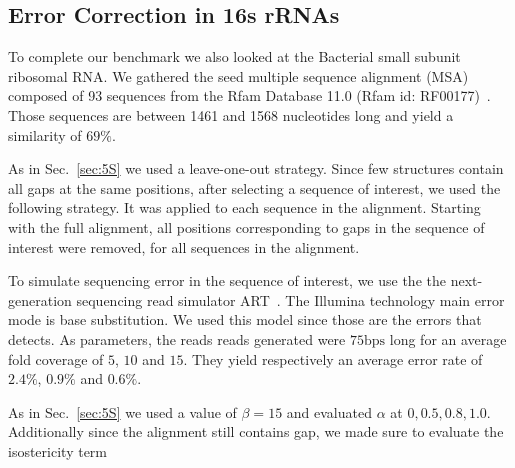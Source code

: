 \subsection{Error Correction in 16s rRNAs}
\label{sec:16S}

To complete our benchmark we also looked at the Bacterial small subunit ribosomal RNA. 
We gathered the seed multiple sequence alignment (MSA) composed of 93 sequences from the Rfam Database 11.0 (Rfam id: RF00177)~\cite{gardner2011rfam}.
Those sequences are between 1461 and 1568 nucleotides long and yield a similarity of $69\%$.

As in Sec.~\ref{sec:5S} we used a leave-one-out strategy. Since few structures contain all gaps 
at the same positions, after selecting a sequence of interest,  we used the following strategy.
 It was applied to each sequence in the alignment. Starting with the full alignment, all positions corresponding to gaps in the sequence of interest were removed, for all sequences in the alignment.  

To simulate sequencing error in the sequence of interest,
 we use the the next-generation sequencing read simulator 
ART~\cite{huang2012art}. The Illumina technology main error mode is base substitution. We used
this model since those
are the errors that \RNApyro detects. As parameters, the reads reads generated
were $75\text{bps}$ long for an average fold coverage of $5$, $10$ and $15$. 
 They yield respectively an average error rate of $2.4\%$, $0.9\%$ and $0.6\%$.
 
 As in Sec.~\ref{sec:5S} we used a value of $\beta=15$ and evaluated $\alpha$ at $0, 0.5, 0.8, 1.0$. 
 Additionally since the alignment still contains gap, we made sure to evaluate the isostericity term






